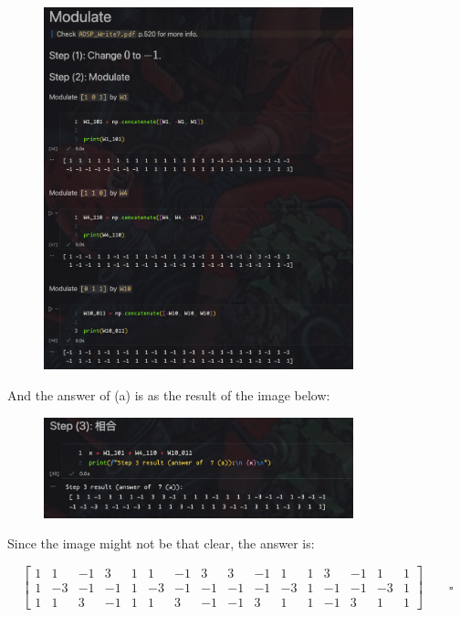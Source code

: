 \documentclass{article}
\begin{document}
\begin{figure}[H]
    \centering
    \includegraphics[width=0.8\textwidth]{HW5_img/7/modulate.png}
\end{figure}

And the answer of (a) is as the result of the image below:

\begin{figure}[H]
    \centering
    \includegraphics[width=0.8\textwidth]{HW5_img/7/result_a.png}
\end{figure}

Since the image might not be that clear, 
the answer is:

\begin{equation*}
    \begin{bmatrix}
    1 & 1 & -1 & 3 & 1 & 1 & -1 & 3 & 3 & -1 & 1 & 1 & 3 & -1 & 1 & 1 \\
    1 & -3 & -1 & -1 & 1 & -3 & -1 & -1 & -1 & -1 & -3 & 1 & -1 & -1 & -3 & 1 \\
    1 & 1 & 3 & -1 & 1 & 1 & 3 & -1 & -1 & 3 & 1 & 1 & -1 & 3 & 1 & 1
    \end{bmatrix} \qquad \square
\end{equation*}
\end{document}
